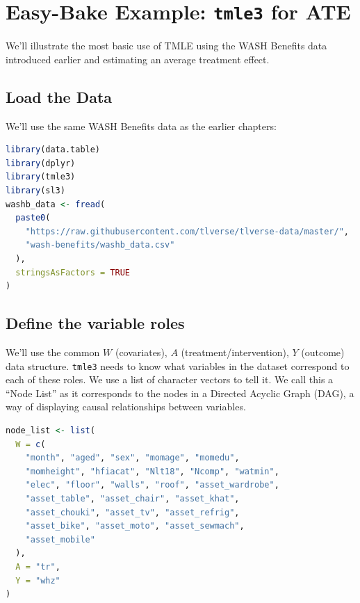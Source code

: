 \documentclass[
  12pt, krantz2,
]{book}
\newcommand{\passthrough}[1]{#1}
\theoremstyle{definition}
\theoremstyle{definition}
\theoremstyle{definition}
\newcommand{\1}{\mathbbm{1}}
\begin{document}
\hypertarget{easy-bake-example-tmle3-for-ate}{%
\section{\texorpdfstring{Easy-Bake Example: \texttt{tmle3} for ATE}{Easy-Bake Example: tmle3 for ATE}}\label{easy-bake-example-tmle3-for-ate}}

We'll illustrate the most basic use of TMLE using the WASH Benefits data
introduced earlier and estimating an average treatment effect.

\hypertarget{load-the-data}{%
\subsection{Load the Data}\label{load-the-data}}

We'll use the same WASH Benefits data as the earlier chapters:

\begin{lstlisting}[language=R]
library(data.table)
library(dplyr)
library(tmle3)
library(sl3)
washb_data <- fread(
  paste0(
    "https://raw.githubusercontent.com/tlverse/tlverse-data/master/",
    "wash-benefits/washb_data.csv"
  ),
  stringsAsFactors = TRUE
)
\end{lstlisting}

\hypertarget{define-the-variable-roles}{%
\subsection{Define the variable roles}\label{define-the-variable-roles}}

We'll use the common \(W\) (covariates), \(A\) (treatment/intervention), \(Y\)
(outcome) data structure. \passthrough{\lstinline!tmle3!} needs to know what variables in the dataset
correspond to each of these roles. We use a list of character vectors to tell
it. We call this a ``Node List'' as it corresponds to the nodes in a Directed
Acyclic Graph (DAG), a way of displaying causal relationships between variables.

\begin{lstlisting}[language=R]
node_list <- list(
  W = c(
    "month", "aged", "sex", "momage", "momedu",
    "momheight", "hfiacat", "Nlt18", "Ncomp", "watmin",
    "elec", "floor", "walls", "roof", "asset_wardrobe",
    "asset_table", "asset_chair", "asset_khat",
    "asset_chouki", "asset_tv", "asset_refrig",
    "asset_bike", "asset_moto", "asset_sewmach",
    "asset_mobile"
  ),
  A = "tr",
  Y = "whz"
)
\end{lstlisting}
\end{document}
